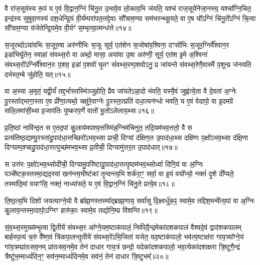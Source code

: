 वै रा॑ज॒सूय॑स्य रू॒पं य ए॒वं वि॒द्वान॒ग्निं चि॑नु॒त उ॒भावे॒व लो॒काव॒भि ज॑यति॒ यश्च॑ राज॒सूये॑नेजा॒नस्य॒ यश्चा᳚ग्नि॒चित॒ इन्द्र॑स्य सुषुवा॒णस्य॑ दश॒धेन्द्रि॒यं वी॒र्य॑म्परा॑पत॒त्तद्दे॒वाः सौ᳚त्राम॒ण्या सम॑भरन्थ्सू॒यते॒ वा ए॒ष यो᳚\-ऽग्निं चि॑नु॒ते᳚\-ऽग्निं चि॒त्वा सौ᳚त्राम॒ण्या य॑जेतेन्द्रि॒यमे॒व वी॒र्यꣳ॑ स॒म्भृत्या॒त्मन्ध॑त्ते॥१४॥

{}

स॒जूरब्दो\-ऽया॑वभिः स॒जूरु॒षा अरु॑णीभिः स॒जूः सूर्य॒ एत॑शेन स॒जोषा॑व॒श्विना॒ दꣳसो॑भिः स॒जूर॒ग्निर्वै᳚श्वान॒र इडा॑भिर्घृ॒तेन॒ स्वाहा॑ संवथ्स॒रो वा अब्दो॒ मासा॒ अया॑वा उ॒षा अरु॑णी॒ सूर्य॒ एत॑श इ॒मे अ॒श्विना॑ संवथ्स॒रो᳚\-ऽग्निर्वै᳚श्वान॒रः प॒शव॒ इडा॑ प॒शवो॑ घृ॒तꣳ सं॑वथ्स॒रम्प॒शवो\-ऽनु॒ प्र जा॑यन्ते संवथ्स॒रेणै॒वास्मै॑ प॒शून्प्र ज॑नयति दर्भस्त॒म्बे जु॑होति॒ यत्॥१५॥

वा अ॒स्या अ॒मृतं॒ यद्वी॒र्यं॑ तद्द॒र्भास्तस्मि॑ञ्जुहोति॒ प्रैव जा॑यते\-ऽन्ना॒दो भ॑वति॒ यस्यै॒वं जुह्व॑त्ये॒ता वै दे॒वता॑ अ॒ग्नेः पु॒रस्ता᳚द्भागा॒स्ता ए॒व प्री॑णा॒त्यथो॒ चक्षु॑रे॒वाग्नेः पु॒रस्ता॒त्प्रति॑ दधा॒त्यन॑न्धो भवति॒ य ए॒वं वेदापो॒ वा इ॒दमग्रे॑ सलि॒लमा॑सी॒थ्स प्र॒जाप॑तिः पुष्करप॒र्णे वातो॑ भू॒तो॑\-ऽलेलाय॒थ्सः॥१६॥

प्र॒ति॒ष्ठां नावि॑न्द॒त स ए॒तद॒पां कु॒लाय॑मपश्य॒त्तस्मि॑न्न॒ग्निम॑चिनुत॒ तदि॒यम॑भव॒त्ततो॒ वै स प्रत्य॑तिष्ठ॒द्याम्पु॒रस्ता॑दु॒पा\-द॑धा॒त्तच्छिरो॑\-ऽभव॒थ्सा प्राची॒ दिग्यां द॑क्षिण॒त उ॒पाद॑धा॒थ्स दक्षि॑णः प॒क्षो॑\-ऽभव॒थ्सा द॑क्षि॒णा दिग्याम्प॒श्चादु॒पा\-द॑धा॒त्तत्पुच्छ॑मभव॒थ्सा प्र॒तीची॒ दिग्यामु॑त्तर॒त उ॒पाद॑धात्॥१७॥

स उत्त॑रः प॒क्षो॑\-ऽभव॒थ्सोदी॑ची॒ दिग्यामु॒परि॑ष्टादु॒पाद॑धा॒त्तत्पृ॒ष्ठम॑भव॒थ्सोर्ध्वा दिगि॒यं वा अ॒ग्निः पञ्चे᳚ष्टक॒स्तस्मा॒द्यद॒स्यां खन॑न्त्य॒भीष्ट॑कां तृ॒न्दन्त्य॒भि शर्क॑रा॒ꣳ॒ सर्वा॒ वा इ॒यं वयो᳚भ्यो॒ नक्तं॑ दृ॒शे दी᳚प्यते॒ तस्मा॑दि॒मां वयाꣳ॑सि॒ नक्तं॒ नाध्या॑सते॒ य ए॒वं वि॒द्वान॒ग्निं चि॑नु॒ते प्रत्ये॒व॥१८॥

ति॒ष्ठ॒त्य॒भि दिशो॑ जयत्याग्ने॒यो वै ब्रा᳚ह्म॒णस्तस्मा᳚द्ब्राह्म॒णाय॒ सर्वा॑सु दि॒क्ष्वर्धु॑क॒ꣴ॒ स्वामे॒व तद्दिश॒मन्वे᳚त्य॒पां वा अ॒ग्निः कु॒लाय॒न्तस्मा॒दापो॒\-ऽग्निꣳ हारु॑काः॒ स्वामे॒व तद्योनि॒म्प्र वि॑शन्ति॥१९॥

{\anuvakamend[{यद॑लेलाय॒थ्स उ॑त्तर॒त उ॒पाद॑धादे॒व द्वात्रिꣳ॑शच्च॥४॥}]}

सं॒व॒थ्स॒रमुख्य॑म्भृ॒त्वा द्वि॒तीये॑ संवथ्स॒र आ᳚ग्ने॒यम॒ष्टाक॑पालं॒ निर्व॑पेदै॒न्द्रमेका॑दशकपालं वैश्वदे॒वं द्वाद॑शकपालम् बार्\mbox{}हस्प॒त्यं च॒रुं वै᳚ष्ण॒वं त्रि॑कपा॒लन्तृ॒तीये॑ संवथ्स॒रे॑\-ऽभि॒जिता॑ यजेत॒ यद॒ष्टाक॑पालो॒ भव॑त्य॒ष्टाक्ष॑रा गाय॒त्र्या᳚ग्ने॒यं गा॑य॒त्रम्प्रा॑तःसव॒नम् प्रा॑तःसव॒नमे॒व तेन॑ दाधार गाय॒त्रं छन्दो॒ यदेका॑दशकपालो॒ भव॒त्येका॑दशाक्षरा त्रि॒ष्टुगै॒न्द्रं त्रैष्टु॑भ॒म्माध्यं॑दिन॒ꣳ॒ सव॑न॒म्माध्यं॑दिनमे॒व सव॑नं॒ तेन॑ दाधार त्रि॒ष्टुभम्᳚॥२०॥

